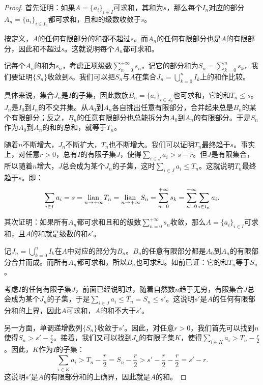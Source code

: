 \documentclass[12pt,UTF8]{ctexbook}
\begin{document}
\begin{proof}
    首先证明：如果$A = \{a_i\}_{i\in I}$可求和，其和为$s$，那么每个$I_n$对应的部分$A_n = \{a_i\}_{i\in I_n}$都可求和，且和的级数收敛于$s$。

    按定义，$A$的任何有限部分的和都不超过$s$。而$A_n$的任何有限部分也是$A$的有限部分，因此和不超过$s$。这就说明每个$A_n$都可求和。
    
    记每个$A_n$的和为$s_n$，考虑正项级数$ \sum_{n=0}^{+\infty} s_n$，记它的部分和为$S_n = \sum_{k=0}^{n} s_k$，我们要证明$\{S_n\}$收敛到$s$。我们可以把$S_n$与$A$在集合$J_n = \bigcup_{k=0}^n I_k$上的和作比较。

    具体来说，集合$J_n$是$I$的子集，因此数族$B_n = \{a_i\}_{i\in J_n}$也可求和，它的和$T_n\leqslant s$。$J_n$是$I_0$到$I_n$的不交并集。从$A_0$到$A_n$各自挑出任意有限部分，合并起来总是$B_n$的某个有限部分；反之，$B_n$的任意有限部分也总能拆分为$A_0$到$A_n$的有限部分。于是$S_n$作为$A_0$到$A_n$的和的总和，就等于$T_n$。
    
    随着$n$不断增大，$J_n$不断扩大，$T_n$也不断增大。我们可以证明$T_n$最终趋于$s$。事实上，对任意$r>0$，总有$I$的有限子集$J$，使得$\sum_{i\in J} a_i > s - r$。但$J$是有限集合，所以随着$n$增大，$J$总会成为某个$J_n$的子集，这时$\sum_{i\in J} a_i\leqslant T_n$。这就说明$T_n$最终趋于$s$。即：
    $$ \sum_{i\in I} a_i = s = \underset{n\to +\infty}{\operatorname{lian}\,} T_n = \underset{n\to +\infty}{\operatorname{lian}\,} S_n = \sum_{n=0}^{+\infty} s_k = \sum_{n=0}^{+\infty} \sum_{i\in I_n} a_i. $$

    其次证明：如果所有$A_n$都可求和且和的级数$\sum_{n=0}^{+\infty} s_n$收敛，那么$A = \{a_i\}_{i\in I}$可求和，且$A$的和就是级数的和$s'$。

    记$J_n = \bigcup_{k=0}^n I_k$在$A$中对应的部分为$B_n$。$B_n$的任意有限部分都是$A_0$到$A_n$的有限部分合并而成。而所有$A_n$都可求和，所以$B_n$也可求和。如前已证：它的和$T_n$等于$S_n$。

    考虑$I$的任何有限子集$J$，前面已经说明过，随着自然数$n$趋于无穷，有限集合$J$总会成为某个$J_n$的子集，于是$\sum_{i\in J} a_i\leqslant T_n = S_n \leqslant s'$。这说明$s'$是$A$的任何有限部分和的上界，因此$A$可求和，$A$的和不大于$s'$。

    另一方面，单调递增数列$\{S_n\}$收敛于$s'$。因此，对任意$r>0$，我们首先可以找到$n$使得$S_n > s' - \frac{r}{2}$。接着，我们又可以找到$J_n$的有限子集$K$，使得$\sum_{i\in K} a_i > T_n - \frac{r}{2}$。因此，$K$作为$I$的子集：
    $$\sum_{i\in K} a_i > T_n - \frac{r}{2} = S_n - \frac{r}{2} > s' - \frac{r}{2} - \frac{r}{2} = s' - r. $$
    这说明$s'$是$A$的有限部分和的上确界，因此就是$A$的和。

\end{proof}
\end{document}
